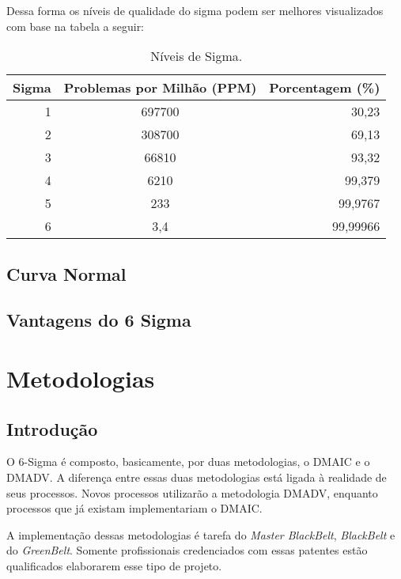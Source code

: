 \documentclass{abnt}
\begin{document}
			Dessa forma os níveis de qualidade do sigma podem ser melhores visualizados com base na tabela a seguir:
			\begin{table}[h]
				\centering

				\begin{tabular}{rcr}
					\toprule
					Sigma & Problemas por Milhão (PPM) & Porcentagem (\%) \\
					\midrule
					 1 & 697700	& 30,23 	\\
					 2 & 308700 & 69,13 	\\
					 3 & 66810 	& 93,32 	\\
					 4 & 6210 	& 99,379 	\\
					 5 & 233 	& 99,9767 	\\
					 6 & 3,4 	& 99,99966 	\\
					\bottomrule		
				\end{tabular}
	
				\label{tab_niveisSigma}
				\caption{Níveis de Sigma.}
				
			\end{table}

		\section {Curva Normal} 
		    
		\section {Vantagens do 6 Sigma}
				
	\chapter {Metodologias}
		\section {Introdução}
		
			 O 6-Sigma é composto, basicamente, por duas metodologias, o DMAIC e o DMADV. A diferença entre 
			 essas duas metodologias está ligada à realidade de seus processos. Novos processos utilizarão 
			 a metodologia DMADV, enquanto processos que já existam implementariam o DMAIC.
			 
			 A implementação dessas metodologias é tarefa do \textit{Master BlackBelt}, \textit{BlackBelt} e do \textit{GreenBelt}. Somente profissionais 
			 credenciados com essas patentes estão qualificados elaborarem esse tipo de projeto.
			 
\end{document}
